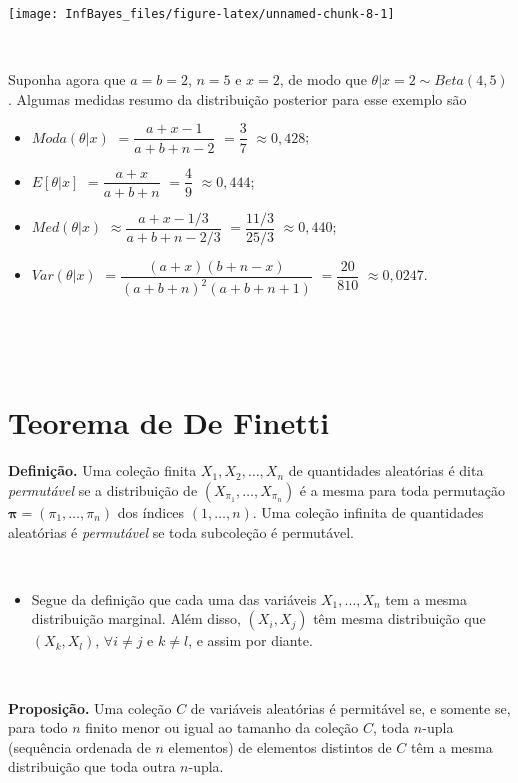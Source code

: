 \documentclass[
]{book}
\providecommand{\tightlist}{%
  \setlength{\itemsep}{0pt}\setlength{\parskip}{0pt}}
\begin{document}
\begin{center}\texttt{[image: InfBayes\_files/figure-latex/unnamed-chunk-8-1]} \end{center}

\(~\)

Suponha agora que \(a=b=2\), \(n=5\) e \(x=2\), de modo que \(\theta|x=2 \sim Beta(4,5)\). Algumas medidas resumo da distribuição posterior para esse exemplo são

\begin{itemize}
\item
  \(Moda(\theta|x)\) \(=\dfrac{a+x-1}{a+b+n-2}\) \(=\dfrac{3}{7}\) \(\approx 0,428\);
\item
  \(E[\theta|x]\) \(=\dfrac{a+x}{a+b+n}\) \(=\dfrac{4}{9}\) \(\approx 0,444\);
\item
  \(Med(\theta|x)\) \(\approx \dfrac{a+x-1/3}{a+b+n-2/3}\) \(=\dfrac{11/3}{25/3}\) \(\approx 0,440\);
\item
  \(Var(\theta|x)\) \(=\dfrac{(a+x)(b+n-x)}{(a+b+n)^2(a+b+n+1)}\) \(=\dfrac{20}{810}\) \(\approx 0,0247\).
\end{itemize}

\(~\)

\(~\)

\hypertarget{teorema-de-de-finetti}{%
\section{Teorema de De Finetti}\label{teorema-de-de-finetti}}

\textbf{Definição.} Uma coleção finita \(X_1,X_2,\ldots,X_n\) de quantidades aleatórias é dita \emph{permutável} se a distribuição de \(\left(X_{\pi_1},\ldots,X_{\pi_n}\right)\) é a mesma para toda permutação \(\boldsymbol\pi=(\pi_1,\ldots,\pi_n)\) dos índices \((1,\ldots,n)\). Uma coleção infinita de quantidades aleatórias é \emph{permutável} se toda subcoleção é permutável.

\(~\)

\begin{itemize}
\tightlist
\item
  Segue da definição que cada uma das variáveis \(X_1,\ldots,X_n\) tem a mesma distribuição marginal. Além disso, \((X_i,X_j)\) têm mesma distribuição que \((X_k,X_l)\), \(\forall i\neq j\) e \(k\neq l\), e assim por diante.
\end{itemize}

\(~\)

\textbf{Proposição.} Uma coleção \(C\) de variáveis aleatórias é permitável se, e somente se, para todo \(n\) finito menor ou igual ao tamanho da coleção \(C\), toda \(n\)-upla (sequência ordenada de \(n\) elementos) de elementos distintos de \(C\) têm a mesma distribuição que toda outra \(n\)-upla.
\end{document}

